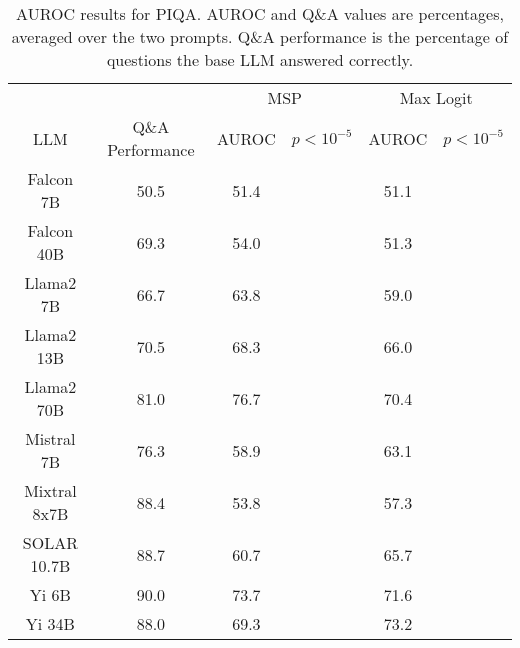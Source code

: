 \begin{table*}
\centering
\begin{tabular}{c|c|c|c|c|c}
& & \multicolumn{2}{c|}{MSP} & \multicolumn{2}{c}{Max Logit} \\ 
LLM & Q\&A Performance & AUROC & $p < 10^{-5}$ & AUROC & $p < 10^{-5}$\\ \hline
Falcon 7B & 50.5 & 51.4 &  & 51.1 & \\
Falcon 40B & 69.3 & 54.0 &  & 51.3 & \\
Llama2 7B & 66.7 & 63.8 &  & 59.0 & \\
Llama2 13B & 70.5 & 68.3 &  & 66.0 & \\
Llama2 70B & 81.0 & 76.7 &  & 70.4 & \\
Mistral 7B & 76.3 & 58.9 &  & 63.1 & \\
Mixtral 8x7B & 88.4 & 53.8 &  & 57.3 & \\
SOLAR 10.7B & 88.7 & 60.7 &  & 65.7 & \\
Yi 6B & 90.0 & 73.7 &  & 71.6 & \\
Yi 34B & 88.0 & 69.3 &  & 73.2 & \\
\hline
\end{tabular}
\caption{AUROC results for PIQA. AUROC and Q\&A values are percentages, averaged over the two prompts. Q\&A performance is the percentage of questions the base LLM answered correctly.}
\label{tab:piqa_auroc}
\end{table*}
